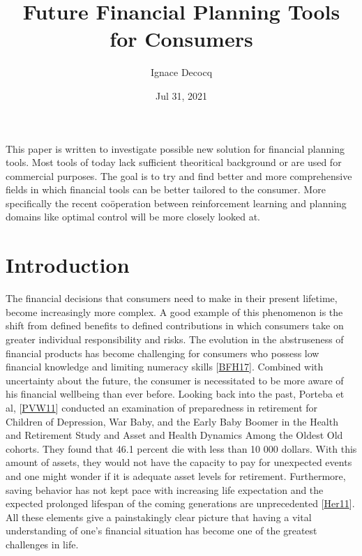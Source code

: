 \documentclass[letterpaper,10pt,english]{jupyterBook}
\title{Future Financial Planning Tools for Consumers}
\date{Jul 31, 2021}
\author{Ignace Decocq}
\begin{document}
\pagestyle{empty}
\sphinxmaketitle
\pagestyle{plain}
\sphinxtableofcontents
\pagestyle{normal}
\label{\detokenize{abstract::doc}}


\sphinxAtStartPar
This paper is  written to investigate possible new solution for financial planning tools. Most tools of today lack sufficient theoritical background or are used for commercial purposes. The goal is to try and find better and more comprehensive fields in which financial tools can be better tailored to the consumer. More specifically the recent coöperation between reinforcement learning and planning domains like optimal control will be more closely looked at.


\section{Introduction}
\label{\detokenize{Introduction:introduction}}\label{\detokenize{Introduction::doc}}
\sphinxAtStartPar
The financial decisions that consumers need to make in their present lifetime, become increasingly more complex. A good example of this phenomenon is the shift from defined benefits to defined contributions in which consumers take on greater individual responsibility and risks. The evolution in the abstruseness of financial products has become challenging for consumers who possess low financial knowledge and limiting numeracy skills {[}\hyperlink{cite.Financial_application:id31}{BFH17}{]}. Combined with uncertainty about the future, the consumer is necessitated to be more aware of his financial well\sphinxhyphen{}being than ever before. Looking back into the past, Porteba et al, {[}\hyperlink{cite.Financial_application:id33}{PVW11}{]} conducted an examination of preparedness in retirement for Children of Depression, War Baby, and the Early Baby Boomer in the Health and Retirement Study and Asset and Health Dynamics Among the Oldest Old cohorts. They found that 46.1 percent die with less than 10 000 dollars. With this amount of assets, they would not have the capacity to pay for unexpected events and one might wonder if it is adequate asset levels for retirement. Furthermore, saving behavior has not kept pace with increasing life expectation and the expected prolonged lifespan of the coming generations are unprecedented {[}\hyperlink{cite.Financial_application:id34}{Her11}{]}. All these elements give a painstakingly clear picture that having a vital understanding of one’s financial situation has become one of the greatest challenges in life.
\end{document}
